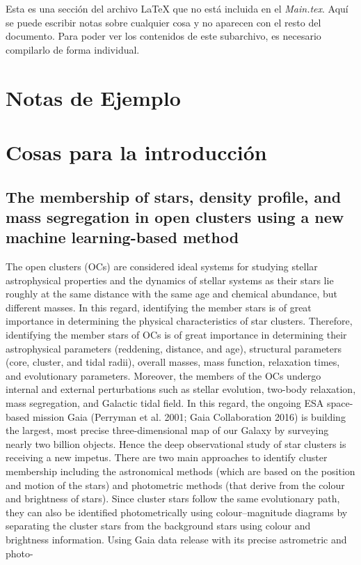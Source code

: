 \documentclass[../Main.tex]{subfiles}
\begin{document}
Esta es una sección del archivo \LaTeX{} que no está incluida en el \textit{Main.tex}. Aquí se puede escribir notas sobre cualquier cosa y no aparecen con el resto del documento. Para poder ver los contenidos de este subarchivo, es necesario compilarlo de forma individual.

\section{Notas de Ejemplo}

\section{Cosas para la introducción}

\subsection{The membership of stars, density profile, and mass segregation in open clusters using a new machine learning-based method} %
The open clusters (OCs) are considered ideal systems for studying stellar astrophysical properties and the dynamics of stellar systems as their stars lie roughly at the same distance with the same age and chemical abundance, but different masses. In this regard, identifying the member stars is of great importance in determining the physical characteristics of star clusters. Therefore, identifying the member stars of OCs is of great importance in determining their astrophysical parameters (reddening, distance, and age), structural parameters (core, cluster, and tidal radii), overall masses, mass function, relaxation times, and evolutionary parameters. Moreover, the members of the OCs undergo internal and external perturbations such as stellar evolution, two-body relaxation, mass segregation, and Galactic tidal field. In this regard, the ongoing ESA space-based mission Gaia (Perryman et al. 2001; Gaia Collaboration 2016) is building the largest, most precise three-dimensional map of our Galaxy by surveying nearly two billion objects. Hence the deep observational study of star clusters is receiving a new impetus. There are two main approaches to identify cluster membership including the astronomical methods (which are based on the position and motion of the stars) and photometric methods (that derive from the colour and brightness of stars). Since cluster stars follow the same evolutionary path, they can also be identified photometrically using colour–magnitude diagrams by separating the cluster stars from the background stars using colour and brightness information. Using Gaia data release with its precise astrometric and photo-
\end{document}
